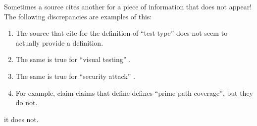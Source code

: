 Sometimes a source cites another for a piece of information that does not
appear! \ifnotpaper The following discrepancies are examples of this:

    \begin{enumerate}
        \item %
              The source that \citetISTQB{} cite for the definition of ``test
              type'' does not seem to actually provide a definition.
        \item %
              The same is true for ``visual testing'' \citepISTQB{}.
        \item %
              The same is true for ``security attack'' \citepISTQB{}.
        \item %
              \else For example, \fi \citet[p.~184]{DoğanEtAl2014} \ifnotpaper claim \else
                  claims \fi that \citet{SakamotoEtAl2013} \ifnotpaper define
              \else defines \fi ``prime path coverage'', but \ifnotpaper they
              do not. \end{enumerate} \else it does not. \fi
